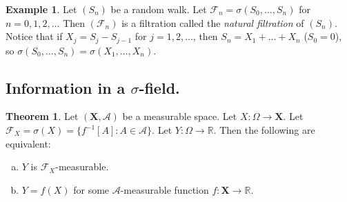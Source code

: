 \documentclass{article}
\newcommand{\R}{\mathbb{R}}
\newcommand{\F}{\mathscr{F}}
\theoremstyle{definition}
\newtheorem{theorem}{Theorem}
\newtheorem*{example}{Example}
\begin{document}
\begin{example}
Let $(S_n)$ be a random walk. Let $\F_n = \sigma(S_0, \dots, S_n)$ for $n = 0, 1, 2, \dots$ Then $(\F_n)$ is a filtration called the \emph{natural filtration} of $(S_n)$. Notice that if $X_j = S_j - S_{j-1}$ for $j = 1, 2, \dots$, then $S_n = X_1 + \dots + X_n$ ($S_0 = 0$), so $\sigma(S_0, \dots, S_n) = \sigma(X_1, \dots, X_n)$.
\end{example}

\subsection*{Information in a $\sigma$-field.}

\begin{theorem}
    Let $(\mathbf{X}, \mathscr{A})$ be a measurable space. Let $X : \Omega \to \mathbf{X}$. Let $\F_X = \sigma(X) = \{f^{-1}[A] : A \in \mathscr{A}\}$. Let $Y : \Omega \to \R$. Then the following are equivalent:
    \begin{enumerate}[(a)]
        \item $Y$ is $\F_X$-measurable.
        \item $Y = f(X)$ for some $\mathscr{A}$-measurable function $f : \mathbf{X} \to \R$.
    \end{enumerate}
\end{theorem}
\end{document}
